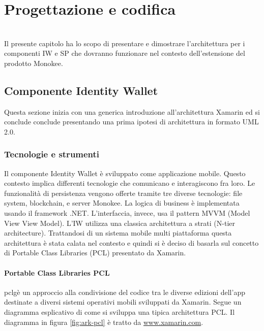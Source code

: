 
\chapter{Progettazione e codifica}
\label{cap:progettazione-codifica}

\\
Il presente capitolo ha lo scopo di presentare e dimostrare l'architettura per i componenti IW e SP che dovranno funzionare nel contesto dell'estensione del prodotto Monokee.
\section{Componente Identity Wallet}
Questa sezione inizia con una generica introduzione all’architettura Xamarin ed si conclude conclude presentando una prima ipotesi di architettura in formato UML 2.0.
\subsection{Tecnologie e strumenti}
\label{sec:tecnologie-strumenti}
Il componente Identity Wallet è sviluppato come applicazione mobile. Questo contesto implica differenti tecnologie che comunicano e interagiscono fra loro. Le funzionalità di persistenza vengono offerte tramite tre diverse tecnologie: file system, blockchain, e server Monokee. La logica di business è implementata usando il framework .NET. L’interfaccia, invece, usa il pattern MVVM (Model View View Model).
L’IW utilizza una classica architettura a strati (N-tier architecture). Trattandosi di un sistema mobile multi piattaforma questa architettura è stata calata nel contesto e quindi si è deciso di basarla sul concetto di Portable Class Libraries (PCL) presentato da Xamarin. 

\subsubsection{Portable Class Libraries PCL}
\gls{pclg}\glsfirstoccur è un approccio alla condivisione del codice tra le diverse edizioni dell’app destinate a diversi sistemi operativi mobili sviluppati da Xamarin. Segue un diagramma esplicativo di come si sviluppa una tipica architettura PCL. Il diagramma in figura \ref{fig:ark-pcl} è tratto da \url{www.xamarin.com}.

